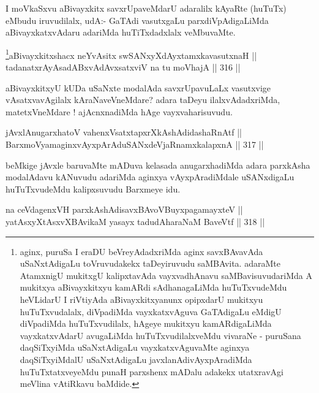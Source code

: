 \begin{artha}
I moVkaSxvu aBivayxkitx savxrUpaveMdarU adaralilx kAyaRte (huTuTx)
eMbudu iruvudilalx, udA:- GaTAdi vasutxgaLu parxdiVpAdigaLiMda
aBivayxkatxvAdaru adariMda huTiTxdadxlalx veMbuvaMte.
\end{artha}



\begin{shl}
\footnote{aginx, puruSa I eraDU beVreyAdadxriMda aginx savxBAvavAda
uSaNxtAdigaLu toVruvudakekx taDeyiruvudu saMBAvita. adaraMte
AtamxnigU mukitxgU kalipxtavAda vayxvadhAnavu saMBavisuvudariMda A
mukitxya aBivayxkitxyu kamARdi sAdhanagaLiMda huTuTxvudeMdu
heVLidarU I riVtiyAda aBivayxkitxyanunx opipxdarU mukitxyu
huTuTxvudalalx, diVpadiMda vayxkatxvAguva GaTAdigaLu eMdigU
diVpadiMda huTuTxvudilalx, hAgeye mukitxyu kamARdigaLiMda
vayxkatxvAdarU avugaLiMda huTuTxvudilalxveMdu vivaraNe - puruSana
daqSiTxyiMda uSaNxtAdigaLu vayxkatxvAguvaMte aginxya daqSiTxyiMdalU
uSaNxtAdigaLu javxlanAdivAyxpAradiMda huTuTxtatxveyeMdu punaH
parxshenx mADalu adakekx utatxravAgi meVlina vAtiRkavu baMdide.}aBivayxkitxshacx neYvAsitx swSANxyXdAyxtamxkavasutxnaH || \\
tadanatxrAyAsadABxvAdAvxsatxviV na tu moVhajA \hfill || 316 ||  
\end{shl}

\begin{artha}
aBivayxkitxyU kUDa uSaNxte modalAda savxrUpavuLaLx
vasutxvige vAsatxvavAgilalx kAraNaveVneMdare? adara taDeyu
ilalxvAdadxriMda, matetxVneMdare ! ajAcnxnadiMda hAge
vayxvaharisuvudu.
\end{artha}

\begin{shl}
jAvxlAnugarxhatoV vahenxVsatxtapxrXkAshAdidashaRnAtf || \\
BarxmoV\s yamaginxvAyxpArAduSANxdeVjaRnamxkalapxnA \hfill || 317 ||  
\end{shl}

\begin{artha}
beMkige jAvxle baruvaMte mADuva kelasada anugarxhadiMda adara
parxkAsha modalAdavu kANuvudu adariMda aginxya vAyxpAradiMdale
uSANxdigaLu huTuTxvudeMdu kalipxsuvudu Barxmeye idu.
\end{artha}

\begin{shl}
na ceVdagenxVH parxkAshAdisavxBAvoV\s BuyxpagamayxteV || \\
yatAsxyXtAsxvXBAvikaM yasayx tadudAharaNaM BaveVtf \hfill || 318 ||  
\end{shl}

